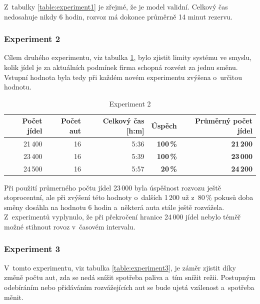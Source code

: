 \documentclass[a4paper, 11pt]{article}
\begin{document}
	Z~tabulky \ref{table:experiment1} je zřejmé, že je model validní. Celkový
	čas nedosahuje nikdy 6 hodin, rozvoz má dokonce průměrně 14 minut rezervu.

	\subsubsection{Experiment 2}
	\label{section:experiment2}

	Cílem druhého experimentu, viz tabulka \ref{table:experiment2}, bylo
	zjistit limity systému ve smyslu, kolik jídel je za aktuálních podmínek
	firma schopná rozvézt za jednu směnu. Vstupní hodnota 
	byla tedy při každém novém experimentu zvýšena o~určitou hodnotu.

	\begin{table}[ht]
		\centering
		\begin{tabular}{|r|r|r|r|r|}
			\hline
			Počet jídel & Počet aut & Celkový čas [h:m] & \textbf{Úspěch}
				& \textbf{Průměrný počet jídel} \\ \hline

			21\,400 & 16 & 5:36 & \textbf{100\,\%} & \textbf{21\,200} \\ \hline
			23\,400 & 16 & 5:39 & \textbf{100\,\%} & \textbf{23\,000} \\ \hline
			24\,500 & 16 & 5:57 & \textbf{20\,\%}  & \textbf{24\,200} \\ \hline
		\end{tabular}

		\caption{Experiment 2}
		\label{table:experiment2}
	\end{table}

	Při použití průmerného počtu jídel 23\,000 byla úspěšnost rozvozu ještě
	stoprocentní, ale při zvýšení této hodnoty o~dalších 1\,200 už z~80\,\%
	pokusů doba směny dosáhla na hodnotu 6 hodin a~některá auta stále ještě
	rozvážela. Z~experimentů vyplynulo, že při překročení hranice 24\,000 jídel
	nebylo téměř možné stihnout rovoz v~časovém intervalu.

	\subsubsection{Experiment 3}

	V~tomto experimentu, viz tabulka \ref{table:experiment3}, je záměr
	zjistit díky změně počtu aut, zda se nedá snížit spotřeba paliva a~tím
	snížit režii. Postupným odebíráním nebo přidáváním rozvážejících aut se
	bude ujetá vzálenost a~spotřeba měnit.
\end{document}

